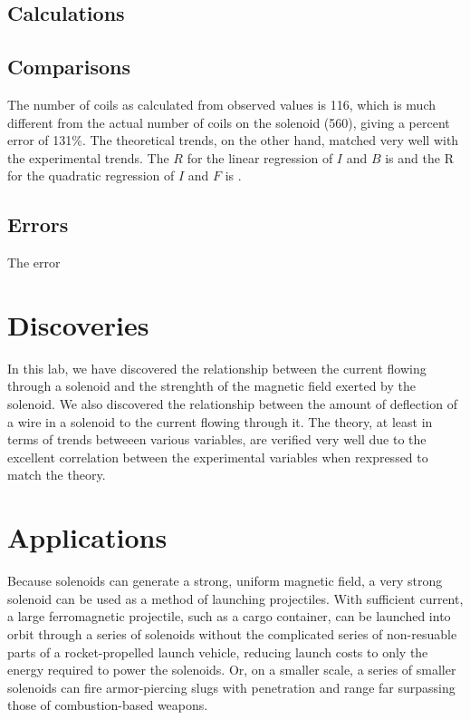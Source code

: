 \documentclass[11pt]{report}
\begin{document}
\subsection{Calculations}

\subsection{Comparisons}
The number of coils as calculated from observed values is 116, which is much different from the actual number of coils on the solenoid (560), giving a percent error of 131\%. The theoretical trends, on the other hand, matched very well with the experimental trends. The $R$ for the linear regression of $I$ and $B$ is
and the R for the quadratic regression of $I$ and $F$ is
.

\subsection{Errors}
The error 

\section{Discoveries}
In this lab, we have discovered the relationship between the current flowing through a solenoid and the strenghth of the magnetic field exerted by the solenoid. We also discovered the relationship between the amount of deflection of a wire in a solenoid to the current flowing through it. The theory, at least in terms of trends betweeen various variables, are verified very well due to the excellent correlation between the experimental variables when rexpressed to match the theory.

\section{Applications}
Because solenoids can generate a strong, uniform magnetic field, a very strong solenoid can be used as a method of launching projectiles. With sufficient current, a large ferromagnetic projectile, such as a cargo container, can be launched into orbit through a series of solenoids without the complicated series of non-resuable parts of a rocket-propelled launch vehicle, reducing launch costs to only the energy required to power the solenoids. Or, on a smaller scale, a series of smaller solenoids can fire armor-piercing slugs with penetration and range far surpassing those of combustion-based weapons.
\end{document}
